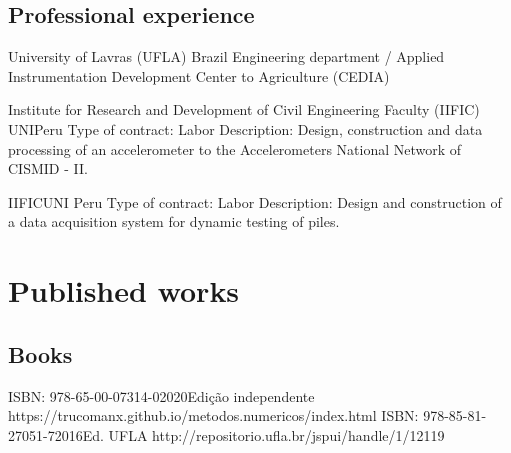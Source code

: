\documentclass[11pt,a4paper,sans]{moderncv} %
\begin{document}
\subsection{Professional experience}
	      {University of Lavras (UFLA)}
	      {}{Brazil}
	      {Engineering department / Applied Instrumentation Development Center to Agriculture (CEDIA) }


		      {Institute for Research and Development of Civil Engineering Faculty (IIFIC)}
		      {UNI}{Peru}
		      {Type of contract: Labor\newline{}
		      Description: Design, construction and data processing of an accelerometer 
		      to the Accelerometers National Network  of CISMID - II.}

		      {IIFIC}{UNI }{Peru}
		      {Type of contract: Labor\newline{}
		      Description: Design and construction  of  a data acquisition system for dynamic testing of piles.}





\section{Published works}
\subsection{Books}
	      {ISBN: 978-65-00-07314-0}{2020}{Edição independente}
	      {https://trucomanx.github.io/metodos.numericos/index.html}
	      {ISBN: 978-85-81-27051-7}{2016}{Ed. UFLA}
	      {http://repositorio.ufla.br/jspui/handle/1/12119}
\end{document}
